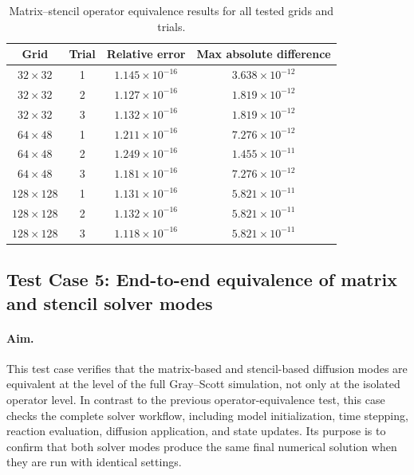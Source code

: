 \begin{table}[htbp]
\centering
\caption{Matrix--stencil operator equivalence results for all tested grids and trials.}
\label{tab:matrix_stencil_operator_equivalence}
\begin{tabular}{|c|c|c|c|}
\hline
Grid & Trial & Relative error & Max absolute difference \\
\hline
\(32\times 32\)   & 1 & \(1.145\times 10^{-16}\) & \(3.638\times 10^{-12}\) \\
\(32\times 32\)   & 2 & \(1.127\times 10^{-16}\) & \(1.819\times 10^{-12}\) \\
\(32\times 32\)   & 3 & \(1.132\times 10^{-16}\) & \(1.819\times 10^{-12}\) \\
\(64\times 48\)   & 1 & \(1.211\times 10^{-16}\) & \(7.276\times 10^{-12}\) \\
\(64\times 48\)   & 2 & \(1.249\times 10^{-16}\) & \(1.455\times 10^{-11}\) \\
\(64\times 48\)   & 3 & \(1.181\times 10^{-16}\) & \(7.276\times 10^{-12}\) \\
\(128\times 128\) & 1 & \(1.131\times 10^{-16}\) & \(5.821\times 10^{-11}\) \\
\(128\times 128\) & 2 & \(1.132\times 10^{-16}\) & \(5.821\times 10^{-11}\) \\
\(128\times 128\) & 3 & \(1.118\times 10^{-16}\) & \(5.821\times 10^{-11}\) \\
\hline
\end{tabular}
\end{table}


\subsection{Test Case 5: End-to-end equivalence of matrix and stencil solver modes}
\label{sec:verification_testcase_solver_equivalence}

\paragraph{Aim.}
This test case verifies that the matrix-based and stencil-based diffusion modes are equivalent at the level of the full Gray--Scott simulation, not only at the isolated operator level. In contrast to the previous operator-equivalence test, this case checks the complete solver workflow, including model initialization, time stepping, reaction evaluation, diffusion application, and state updates. Its purpose is to confirm that both solver modes produce the same final numerical solution when they are run with identical settings.

